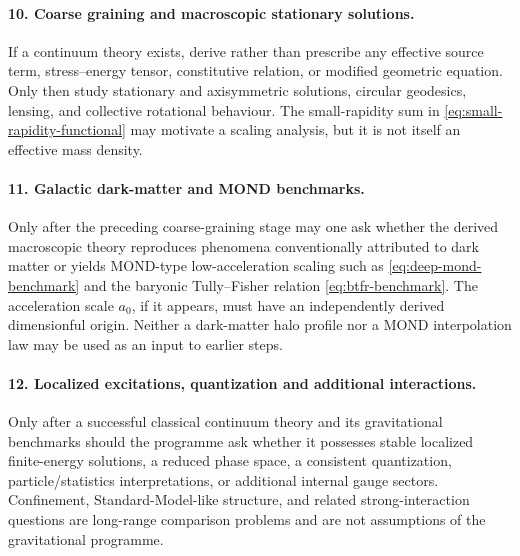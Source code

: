 \documentclass[11pt,a4paper]{article}
\theoremstyle{remark}
\begin{document}
\paragraph{10. Coarse graining and macroscopic stationary solutions.}
If a continuum theory exists, derive rather than prescribe any effective source term, stress--energy tensor, constitutive relation, or modified geometric equation.  Only then study stationary and axisymmetric solutions, circular geodesics, lensing, and collective rotational behaviour.  The small-rapidity sum in \eqref{eq:small-rapidity-functional} may motivate a scaling analysis, but it is not itself an effective mass density.

\paragraph{11. Galactic dark-matter and MOND benchmarks.}
Only after the preceding coarse-graining stage may one ask whether the derived macroscopic theory reproduces phenomena conventionally attributed to dark matter or yields MOND-type low-acceleration scaling such as \eqref{eq:deep-mond-benchmark} and the baryonic Tully--Fisher relation \eqref{eq:btfr-benchmark}.  The acceleration scale \(a_0\), if it appears, must have an independently derived dimensionful origin.  Neither a dark-matter halo profile nor a MOND interpolation law may be used as an input to earlier steps.

\paragraph{12. Localized excitations, quantization and additional interactions.}
Only after a successful classical continuum theory and its gravitational benchmarks should the programme ask whether it possesses stable localized finite-energy solutions, a reduced phase space, a consistent quantization, particle/statistics interpretations, or additional internal gauge sectors.  Confinement, Standard-Model-like structure, and related strong-interaction questions are long-range comparison problems and are not assumptions of the gravitational programme.
\end{document}
